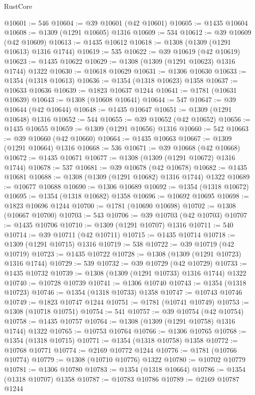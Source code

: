 \begin{lexlean}{RustCore}
\begin{coremodule}
@10601 := 546
@10604 := @39 @10601 (@42 @10601)
@10605 := @1435 @10604
@10608 := @1309 (@1291 @10605) @1316
@10609 := 534
@10612 := @39 @10609 (@42 @10609)
@10613 := @1435 @10612
@10618 := @1308 (@1309 (@1291 @10613) @1316 @1744)
@10619 := 535
@10622 := @39 @10619 (@42 @10619)
@10623 := @1435 @10622
@10629 := @1308 (@1309 (@1291 @10623) @1316 @1744) @1322
@10630 := @10618 @10629
@10631 := @1306 @10630
@10633 := @1354 (@1318 @10613)
@10636 := @1354 (@1318 @10623) @1358
@10637 := @10633 @10636
@10639 := @1823 @10637 @1244
@10641 := @1781 (@10631 @10639)
@10643 := @1308 (@10608 @10641)
@10644 := 547
@10647 := @39 @10644 (@42 @10644)
@10648 := @1435 @10647
@10651 := @1309 (@1291 @10648) @1316
@10652 := 544
@10655 := @39 @10652 (@42 @10652)
@10656 := @1435 @10655
@10659 := @1309 (@1291 @10656) @1316
@10660 := 542
@10663 := @39 @10660 (@42 @10660)
@10664 := @1435 @10663
@10667 := @1309 (@1291 @10664) @1316
@10668 := 536
@10671 := @39 @10668 (@42 @10668)
@10672 := @1435 @10671
@10677 := @1308 (@1309 (@1291 @10672) @1316 @1744)
@10678 := 537
@10681 := @39 @10678 (@42 @10678)
@10682 := @1435 @10681
@10688 := @1308 (@1309 (@1291 @10682) @1316 @1744) @1322
@10689 := @10677 @10688
@10690 := @1306 @10689
@10692 := @1354 (@1318 @10672)
@10695 := @1354 (@1318 @10682) @1358
@10696 := @10692 @10695
@10698 := @1823 @10696 @1244
@10700 := @1781 (@10690 @10698)
@10702 := @1308 (@10667 @10700)
@10703 := 543
@10706 := @39 @10703 (@42 @10703)
@10707 := @1435 @10706
@10710 := @1309 (@1291 @10707) @1316
@10711 := 540
@10714 := @39 @10711 (@42 @10711)
@10715 := @1435 @10714
@10718 := @1309 (@1291 @10715) @1316
@10719 := 538
@10722 := @39 @10719 (@42 @10719)
@10723 := @1435 @10722
@10728 := @1308 (@1309 (@1291 @10723) @1316 @1744)
@10729 := 539
@10732 := @39 @10729 (@42 @10729)
@10733 := @1435 @10732
@10739 := @1308 (@1309 (@1291 @10733) @1316 @1744) @1322
@10740 := @10728 @10739
@10741 := @1306 @10740
@10743 := @1354 (@1318 @10723)
@10746 := @1354 (@1318 @10733) @1358
@10747 := @10743 @10746
@10749 := @1823 @10747 @1244
@10751 := @1781 (@10741 @10749)
@10753 := @1308 (@10718 @10751)
@10754 := 541
@10757 := @39 @10754 (@42 @10754)
@10758 := @1435 @10757
@10764 := @1308 (@1309 (@1291 @10758) @1316 @1744) @1322
@10765 := @10753 @10764
@10766 := @1306 @10765
@10768 := @1354 (@1318 @10715)
@10771 := @1354 (@1318 @10758) @1358
@10772 := @10768 @10771
@10774 := @2169 @10772 @1244
@10776 := @1781 (@10766 @10774)
@10779 := @1308 (@10710 @10776) @1322
@10780 := @10702 @10779
@10781 := @1306 @10780
@10783 := @1354 (@1318 @10664)
@10786 := @1354 (@1318 @10707) @1358
@10787 := @10783 @10786
@10789 := @2169 @10787 @1244

\end{coremodule}
\end{lexlean}
